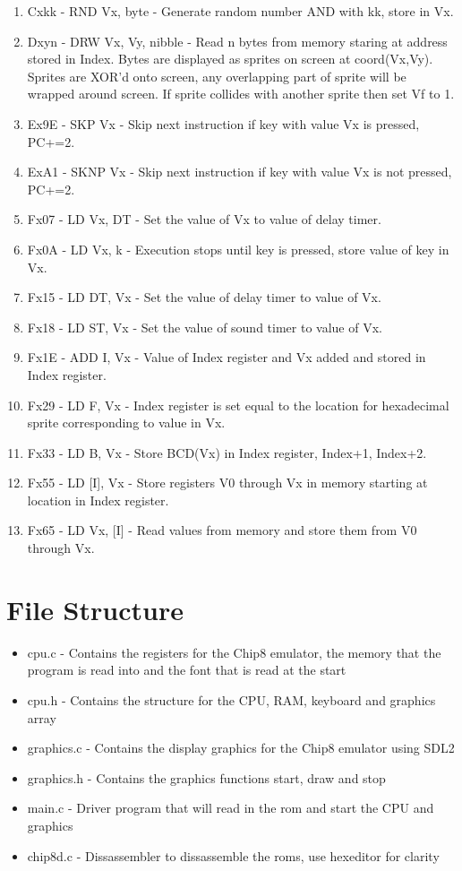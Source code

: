 \documentclass{article}
\begin{document}
\begin{enumerate}
	\item Cxkk - RND Vx, byte - Generate random number AND with kk, store in Vx.
	\item Dxyn - DRW Vx, Vy, nibble - Read n bytes from memory staring at address stored in Index. Bytes are displayed as sprites on screen at coord(Vx,Vy). Sprites are XOR'd onto screen, any overlapping part of sprite will be wrapped around screen. If sprite collides with another sprite then set Vf to 1.
	\item Ex9E - SKP Vx - Skip next instruction if key with value Vx is pressed, PC+=2.
	\item ExA1 - SKNP Vx - Skip next instruction if key with value Vx is not pressed, PC+=2.
	\item Fx07 - LD Vx, DT - Set the value of Vx to value of delay timer.
	\item Fx0A - LD Vx, k - Execution stops until key is pressed, store value of key in Vx.
	\item Fx15 - LD DT, Vx - Set the value of delay timer to value of Vx.
	\item Fx18 - LD ST, Vx - Set the value of sound timer to value of Vx.
	\item Fx1E - ADD I, Vx - Value of Index register and Vx added and stored in Index register.
	\item Fx29 - LD F, Vx - Index register is set equal to the location for hexadecimal sprite corresponding to value in Vx.
	\item Fx33 - LD B, Vx - Store BCD(Vx) in Index register, Index+1, Index+2.
	\item Fx55 - LD [I], Vx - Store registers V0 through Vx in memory starting at location in Index register.
	\item Fx65 - LD Vx, [I] - Read values from memory and store them from V0 through Vx.
\end{enumerate}

\section*{File Structure}
\begin{itemize}
	\item cpu.c - Contains the registers for the Chip8 emulator, the memory that the program is read into and the font that is read at the start
	\item cpu.h - Contains the structure for the CPU, RAM, keyboard and graphics array
	\item graphics.c - Contains the display graphics for the Chip8 emulator using SDL2
	\item graphics.h - Contains the graphics functions start, draw and stop
	\item main.c - Driver program that will read in the rom and start the CPU and graphics
	\item chip8d.c - Dissassembler to dissassemble the roms, use hexeditor for clarity
\end{itemize}
\end{document}

